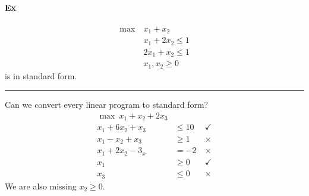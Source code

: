 \documentclass[12 pt]{article}
\begin{document}
        \paragraph{Ex}
        \begin{align*}
          \max\ & x_1 + x_2
          \\ & x_1 + 2x_2 \leq 1
          \\ & 2x_1 + x_2 \leq 1
          \\ & x_1, x_2 \geq 0
        \end{align*}
        is in standard form.
        \\ \noindent \rule{\textwidth}{0.5pt}
        Can we convert every linear program to standard form?
        \begin{align*}
          \max \ x_1 + x_2 + 2x_3 &
          \\ x_1 + 6x_2 + x_3 & \leq 10 \ &\checkmark
          \\ x_1 - x_2 + x_3 & \geq 1 \ &\times
          \\ x_1 + 2x_2 - 3_x & = -2 \ &\times
          \\ x_1 & \geq 0 \ &\checkmark
          \\ x_3 & \leq 0 \ &\times
        \end{align*}
        We are also missing $x_2 \geq 0$.
\end{document}
